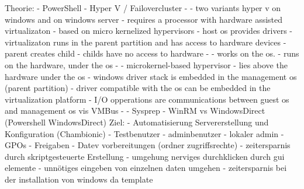 \documentclass[conference]{IEEEtran}
\begin{document}
Theorie:
- PowerShell
- Hyper V / Failovercluster
    - %
    - two variants hyper v on windows and on windows server
    - requires a processor with hardware assisted virtualizaton
    - based on micro kernelized hypervisors 
        - host os provides drivers
        - virtualizaton runs in the parent partition and has access to hardware devices
        - parent creates child
            - childs have no access to hardware
    -%
        - works on the os. 
        - runs on the hardware, under the os
    - %
        - microkernel-based hypervisor 
        - lies above the hardware under the os
        - windows driver stack is embedded in the management os (parent partition)
        - driver compatible with the os can be embedded in the virtualization platform
        - I/O opperations are communications between guest os and management os vis VMBus
        - 
- Sysprep
- WinRM vs WindowsDirect (Powershell WindowsDirect)
Ziel:
- Automatisierung Servererstellung und Konfiguration (Chambionic)
    - Testbenutzer
    - adminbenutzer
    - lokaler admin
    - GPOs
    - Freigaben
    - Datev vorbereitungen (ordner zugriffsrechte)
- zeitersparnis durch skriptgesteuerte Erstellung
- umgehung nerviges durchklicken durch gui elemente
- unnötiges eingeben von einzelnen daten umgehen
- zeitersparnis bei der installation von windows da template
\end{document}
